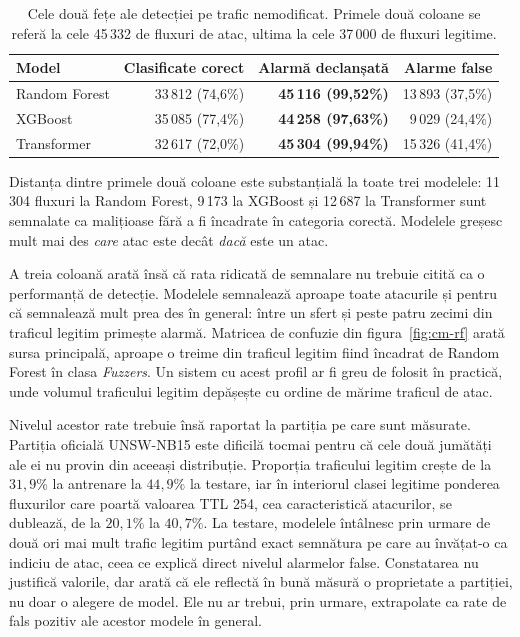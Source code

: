 \begin{table}[H]
    \caption{Cele două fețe ale detecției pe trafic nemodificat. Primele două coloane se referă la cele 45\,332 de fluxuri de atac, ultima la cele 37\,000 de fluxuri legitime.}
    \centering
    \begin{tabular}{|l|r|r|r|}
        \hline
        \textbf{Model} & \textbf{Clasificate corect} & \textbf{Alarmă declanșată} & \textbf{Alarme false} \\
        \hline
        Random Forest & 33\,812 \;(74,6\%) & \textbf{45\,116 \;(99,52\%)} & 13\,893 \;(37,5\%) \\
        \hline
        XGBoost & 35\,085 \;(77,4\%) & \textbf{44\,258 \;(97,63\%)} & 9\,029 \;(24,4\%) \\
        \hline
        Transformer & 32\,617 \;(72,0\%) & \textbf{45\,304 \;(99,94\%)} & 15\,326 \;(41,4\%) \\
        \hline
    \end{tabular}
    \label{tab:eligibil}
\end{table}

Distanța dintre primele două coloane este substanțială la toate trei modelele: 11\,304 fluxuri la Random Forest, 9\,173 la XGBoost și 12\,687 la Transformer sunt semnalate ca malițioase fără a fi încadrate în categoria corectă. Modelele greșesc mult mai des \emph{care} atac este decât \emph{dacă} este un atac.

A treia coloană arată însă că rata ridicată de semnalare nu trebuie citită ca o performanță de detecție. Modelele semnalează aproape toate atacurile și pentru că semnalează mult prea des în general: între un sfert și peste patru zecimi din traficul legitim primește alarmă. Matricea de confuzie din figura~\ref{fig:cm-rf} arată sursa principală, aproape o treime din traficul legitim fiind încadrat de Random Forest în clasa \textit{Fuzzers}. Un sistem cu acest profil ar fi greu de folosit în practică, unde volumul traficului legitim depășește cu ordine de mărime traficul de atac.

Nivelul acestor rate trebuie însă raportat la partiția pe care sunt măsurate. Partiția oficială UNSW-NB15 este dificilă tocmai pentru că cele două jumătăți ale ei nu provin din aceeași distribuție. Proporția traficului legitim crește de la $31{,}9\%$ la antrenare la $44{,}9\%$ la testare, iar în interiorul clasei legitime ponderea fluxurilor care poartă valoarea TTL 254, cea caracteristică atacurilor, se dublează, de la $20{,}1\%$ la $40{,}7\%$. La testare, modelele întâlnesc prin urmare de două ori mai mult trafic legitim purtând exact semnătura pe care au învățat-o ca indiciu de atac, ceea ce explică direct nivelul alarmelor false. Constatarea nu justifică valorile, dar arată că ele reflectă în bună măsură o proprietate a partiției, nu doar o alegere de model. Ele nu ar trebui, prin urmare, extrapolate ca rate de fals pozitiv ale acestor modele în general.

